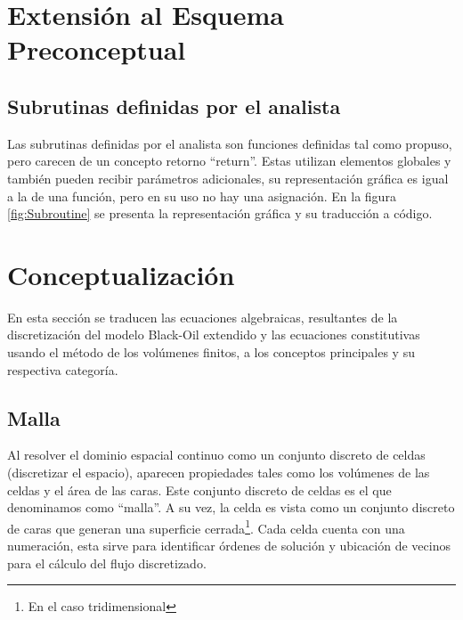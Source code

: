 \section{Extensión al Esquema Preconceptual}\label{sec:PSNew}
\subsection{Subrutinas definidas por el analista}\label{sec:PS_ADS}
Las subrutinas definidas por el analista son funciones definidas tal como \cite{JCalle} propuso, pero carecen de un concepto retorno ``return''. Estas utilizan elementos globales y también pueden recibir parámetros adicionales, su representación gráfica es igual a la de una función, pero en su uso no hay una asignación. En la figura \ref{fig:Subroutine} se presenta la representación gráfica y su traducción a código. %

\section{Conceptualización}\label{sec:Concepts}
En esta sección se traducen las ecuaciones algebraicas, resultantes de la discretización del modelo Black-Oil extendido y las ecuaciones constitutivas usando el método de los volúmenes finitos, a los conceptos principales y su respectiva categoría. 

\subsection{Malla}
Al resolver el dominio espacial continuo como un conjunto discreto de celdas (discretizar el espacio), aparecen propiedades tales como los volúmenes de las celdas y el área de las caras. Este conjunto discreto de celdas es el que denominamos como ``malla''. A su vez, la celda es vista como un conjunto discreto de caras que generan una superficie cerrada\footnote{En el caso tridimensional}. Cada celda cuenta con una numeración, esta sirve para identificar órdenes de solución y ubicación de vecinos para el cálculo del flujo discretizado.

